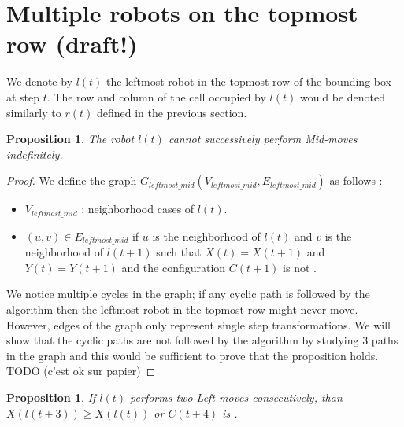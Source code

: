 \documentclass[11pt, a4paper]{article}
\theoremstyle{plain}
\newtheorem{prop}[thm]{Proposition}
\theoremstyle{definition}
\theoremstyle{remark}
\begin{document}
\section{Multiple robots on the topmost row (draft!)}

We denote by $l(t)$ the leftmost robot in the topmost row of the bounding box at
step $t$. The row and column of the cell occupied by $l(t)$ would be denoted
similarly to $r(t)$ defined in the previous section.

\begin{prop}
The robot $l(t)$ cannot successively perform \emph{Mid-move}s indefinitely.
\end{prop}

\begin{proof}

We define the graph $G_{leftmost\_mid}(V_{leftmost\_mid},
E_{leftmost\_mid})$ as follows :
\begin{itemize}
  \item $V_{leftmost\_mid}$ : neighborhood cases of $l(t)$.
  \item $(u,v) \in E_{leftmost\_mid}$ if $u$ is the neighborhood of $l(t)$ and
        $v$ is the neighborhood of $l(t+1)$ such that $X(t)=X(t+1)$ and
        $Y(t)=Y(t+1)$ and the configuration $C(t+1)$ is not \Gathered.
\end{itemize}
We notice multiple cycles in the graph; if any cyclic path is followed by the
algorithm then the leftmost robot in the topmost row might never move. However,
edges of the
graph only represent single step transformations. We will show that the cyclic
paths are not followed by the algorithm by studying 3 paths in the graph and
this would be sufficient to prove that the proposition holds. \\

TODO (c'est ok sur papier)

\end{proof}

\begin{prop}
If $l(t)$ performs two \emph{Left-move}s consecutively, than $X(l(t+3)) \geq
X(l(t))$ or $C(t+4)$ is \Gathered.
\end{prop}
\end{document}
